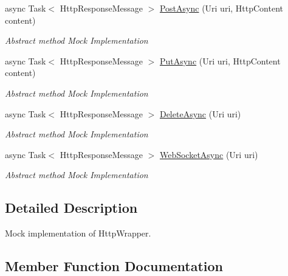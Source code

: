 \begin{DoxyCompactItemize}
async Task$<$ Http\+Response\+Message $>$ \hyperlink{class_microsoft_1_1_tools_1_1_windows_device_portal_1_1_tests_1_1_mock_http_responder_a72aca3d64c972e209d944dad1b62b2f9}{Post\+Async} (Uri uri, Http\+Content content)
\begin{DoxyCompactList}\small\item\em Abstract method Mock Implementation \end{DoxyCompactList}\item 
async Task$<$ Http\+Response\+Message $>$ \hyperlink{class_microsoft_1_1_tools_1_1_windows_device_portal_1_1_tests_1_1_mock_http_responder_a311d39119eb8a74402c5d07b278366d7}{Put\+Async} (Uri uri, Http\+Content content)
\begin{DoxyCompactList}\small\item\em Abstract method Mock Implementation \end{DoxyCompactList}\item 
async Task$<$ Http\+Response\+Message $>$ \hyperlink{class_microsoft_1_1_tools_1_1_windows_device_portal_1_1_tests_1_1_mock_http_responder_aa65ece89e87b58c7aafc44893ef2c19d}{Delete\+Async} (Uri uri)
\begin{DoxyCompactList}\small\item\em Abstract method Mock Implementation \end{DoxyCompactList}\item 
async Task$<$ Http\+Response\+Message $>$ \hyperlink{class_microsoft_1_1_tools_1_1_windows_device_portal_1_1_tests_1_1_mock_http_responder_afabc4a33cd37a539d51426ce53f0667d}{Web\+Socket\+Async} (Uri uri)
\begin{DoxyCompactList}\small\item\em Abstract method Mock Implementation \end{DoxyCompactList}\end{DoxyCompactItemize}


\subsection{Detailed Description}
Mock implementation of Http\+Wrapper. 



\subsection{Member Function Documentation}
